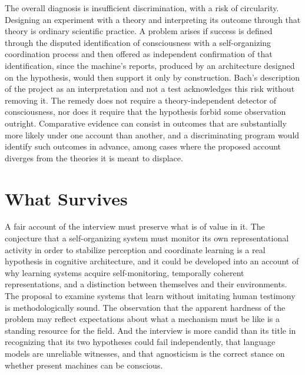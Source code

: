 \documentclass[11pt]{article}
\begin{document}
The overall diagnosis is insufficient discrimination, with a risk of circularity. Designing an experiment with a theory and interpreting its outcome through that theory is ordinary scientific practice. A problem arises if success is defined through the disputed identification of consciousness with a self-organizing coordination process and then offered as independent confirmation of that identification, since the machine's reports, produced by an architecture designed on the hypothesis, would then support it only by construction. Bach's description of the project as an interpretation and not a test acknowledges this risk without removing it. The remedy does not require a theory-independent detector of consciousness, nor does it require that the hypothesis forbid some observation outright. Comparative evidence can consist in outcomes that are substantially more likely under one account than another, and a discriminating program would identify such outcomes in advance, among cases where the proposed account diverges from the theories it is meant to displace.

\section{What Survives}

A fair account of the interview must preserve what is of value in it. The conjecture that a self-organizing system must monitor its own representational activity in order to stabilize perception and coordinate learning is a real hypothesis in cognitive architecture, and it could be developed into an account of why learning systems acquire self-monitoring, temporally coherent representations, and a distinction between themselves and their environments. The proposal to examine systems that learn without imitating human testimony is methodologically sound. The observation that the apparent hardness of the problem may reflect expectations about what a mechanism must be like is a standing resource for the field. And the interview is more candid than its title in recognizing that its two hypotheses could fail independently, that language models are unreliable witnesses, and that agnosticism is the correct stance on whether present machines can be conscious.
\end{document}
